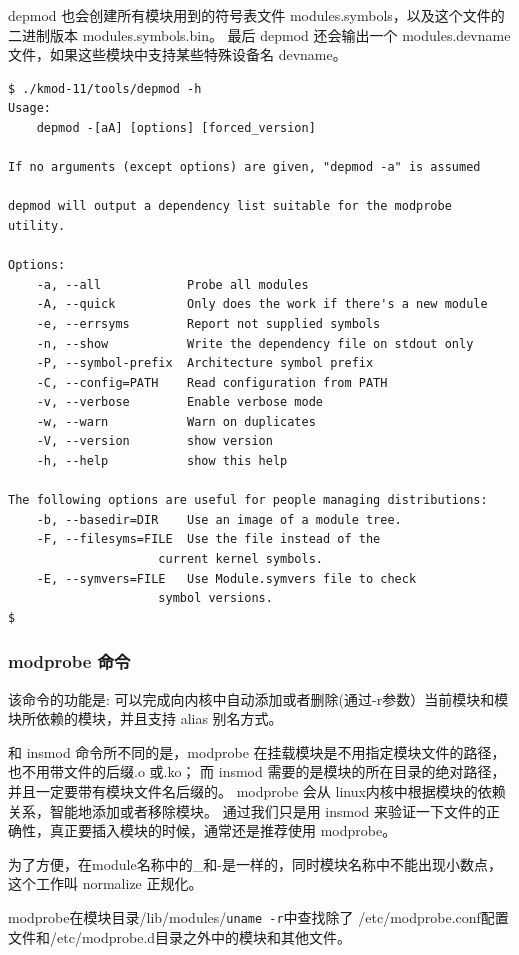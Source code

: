 depmod 也会创建所有模块用到的符号表文件
modules.symbols，以及这个文件的二进制版本 modules.symbols.bin。 最后
depmod 还会输出一个 modules.devname
文件，如果这些模块中支持某些特殊设备名 devname。

{\begin{shaded}\begin{verbatim}
$ ./kmod-11/tools/depmod -h
Usage:
    depmod -[aA] [options] [forced_version]

If no arguments (except options) are given, "depmod -a" is assumed

depmod will output a dependency list suitable for the modprobe utility.

Options:
    -a, --all            Probe all modules
    -A, --quick          Only does the work if there's a new module
    -e, --errsyms        Report not supplied symbols
    -n, --show           Write the dependency file on stdout only
    -P, --symbol-prefix  Architecture symbol prefix
    -C, --config=PATH    Read configuration from PATH
    -v, --verbose        Enable verbose mode
    -w, --warn           Warn on duplicates
    -V, --version        show version
    -h, --help           show this help

The following options are useful for people managing distributions:
    -b, --basedir=DIR    Use an image of a module tree.
    -F, --filesyms=FILE  Use the file instead of the
                     current kernel symbols.
    -E, --symvers=FILE   Use Module.symvers file to check
                     symbol versions.
$ 
\end{verbatim}\end{shaded}}
\subsubsection{modprobe 命令}

该命令的功能是:
可以完成向内核中自动添加或者删除(通过-r参数）当前模块和模块所依赖的模块，并且支持
alias 别名方式。

和 insmod 命令所不同的是，modprobe
在挂载模块是不用指定模块文件的路径，也不用带文件的后缀.o 或.ko； 而 insmod
需要的是模块的所在目录的绝对路径，并且一定要带有模块文件名后缀的。
modprobe 会从 linux内核中根据模块的依赖关系，智能地添加或者移除模块。
通过我们只是用 insmod
来验证一下文件的正确性，真正要插入模块的时候，通常还是推荐使用 modprobe。

为了方便，在module名称中的\_和-是一样的，同时模块名称中不能出现小数点，这个工作叫
normalize 正规化。

modprobe在模块目录/lib/modules/\texttt{uname -r}中查找除了
/etc/modprobe.conf配置文件和/etc/modprobe.d目录之外中的模块和其他文件。

